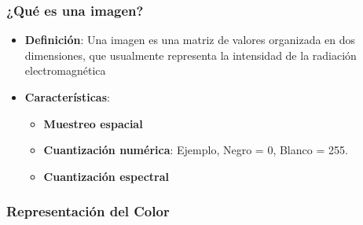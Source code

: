 	

\subsubsection{¿Qué es una imagen?}

\begin{itemize}
	\item \textbf{Definición}: Una imagen es una matriz de valores organizada en dos dimensiones, que usualmente representa la intensidad de la radiación electromagnética
	\item \textbf{Características}:
	\begin{itemize}
		\item \textbf{Muestreo espacial}
		\item \textbf{Cuantización numérica}: Ejemplo, Negro = 0, Blanco = 255.
		\item \textbf{Cuantización espectral}
	\end{itemize}
\end{itemize}

\subsubsection{Representación del Color}


